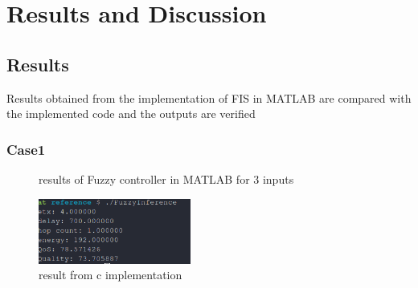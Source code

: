 \chapter{Results and Discussion} \label{Results}
\section{Results} \label{Results}
Results obtained from the implementation of FIS in MATLAB are compared with the implemented code and the outputs are verified
\subsection{Case1} \label{Case 1: 3 metrics}
\begin{figure}[H]
\centering
{}
\caption{results of Fuzzy controller in MATLAB for 3 inputs}
\label{fig:method}
\end{figure}
\begin{figure}[h!]
\centering
\includegraphics[width=50mm]{result3inputcode.png}
\caption{result from c implementation}
\end{figure}

